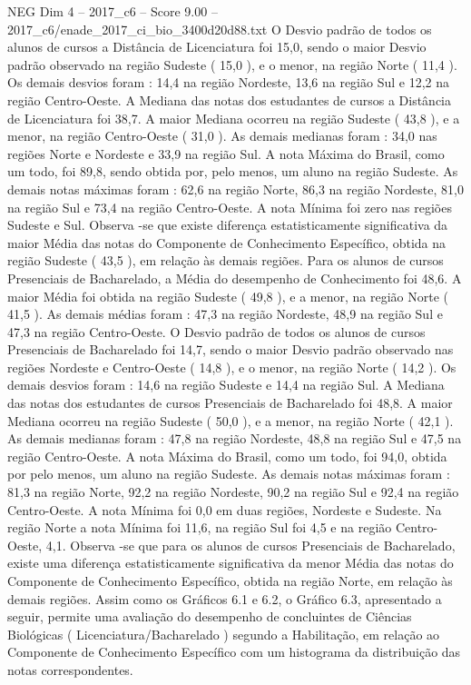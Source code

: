 \begin{textsample}{NEG Dim 4 – 2017\_c6 – Score 9.00 – 2017\_c6/enade\_2017\_ci\_bio\_3400d20d88.txt}
O Desvio padrão de todos os alunos de cursos a Distância de Licenciatura foi 15,0, sendo o maior Desvio padrão observado na região Sudeste ( 15,0 ), e o menor, na região Norte ( 11,4 ).
Os demais desvios foram : 14,4 na região Nordeste, 13,6 na região Sul e 12,2 na região Centro-Oeste.
A Mediana das notas dos estudantes de cursos a Distância de Licenciatura foi 38,7.
A maior Mediana ocorreu na região Sudeste ( 43,8 ), e a menor, na região Centro-Oeste ( 31,0 ).
As demais medianas foram : 34,0 nas regiões Norte e Nordeste e 33,9 na região Sul.
A nota Máxima do Brasil, como um todo, foi 89,8, sendo obtida por, pelo menos, um aluno na região Sudeste.
As demais notas máximas foram : 62,6 na região Norte, 86,3 na região Nordeste, 81,0 na região Sul e 73,4 na região Centro-Oeste.
A nota Mínima foi zero nas regiões Sudeste e Sul.
Observa -se que existe diferença estatisticamente significativa da maior Média das notas do Componente de Conhecimento Específico, obtida na região Sudeste ( 43,5 ), em relação às demais regiões.
Para os alunos de cursos Presenciais de Bacharelado, a Média do desempenho de Conhecimento foi 48,6.
A maior Média foi obtida na região Sudeste ( 49,8 ), e a menor, na região Norte ( 41,5 ).
As demais médias foram : 47,3 na região Nordeste, 48,9 na região Sul e 47,3 na região Centro-Oeste.
O Desvio padrão de todos os alunos de cursos Presenciais de Bacharelado foi 14,7, sendo o maior Desvio padrão observado nas regiões Nordeste e Centro-Oeste ( 14,8 ), e o menor, na região Norte ( 14,2 ).
Os demais desvios foram : 14,6 na região Sudeste e 14,4 na região Sul.
A Mediana das notas dos estudantes de cursos Presenciais de Bacharelado foi 48,8.
A maior Mediana ocorreu na região Sudeste ( 50,0 ), e a menor, na região Norte ( 42,1 ).
As demais medianas foram : 47,8 na região Nordeste, 48,8 na região Sul e 47,5 na região Centro-Oeste.
A nota Máxima do Brasil, como um todo, foi 94,0, obtida por pelo menos, um aluno na região Sudeste.
As demais notas máximas foram : 81,3 na região Norte, 92,2 na região Nordeste, 90,2 na região Sul e 92,4 na região Centro-Oeste.
A nota Mínima foi 0,0 em duas regiões, Nordeste e Sudeste.
Na região Norte a nota Mínima foi 11,6, na região Sul foi 4,5 e na região Centro-Oeste, 4,1.
Observa -se que para os alunos de cursos Presenciais de Bacharelado, existe uma diferença estatisticamente significativa da menor Média das notas do Componente de Conhecimento Específico, obtida na região Norte, em relação às demais regiões.
Assim como os Gráficos 6.1 e 6.2, o Gráfico 6.3, apresentado a seguir, permite uma avaliação do desempenho de concluintes de Ciências Biológicas ( Licenciatura/Bacharelado ) segundo a Habilitação, em relação ao Componente de Conhecimento Específico com um histograma da distribuição das notas correspondentes.

\end{textsample}
